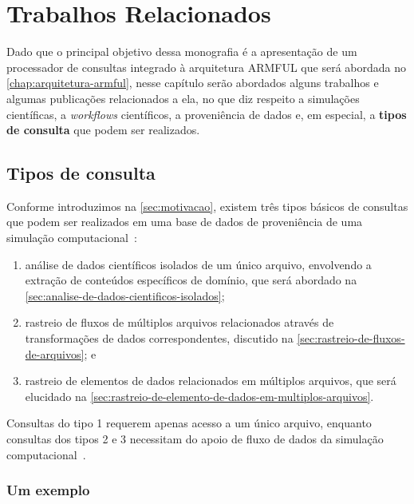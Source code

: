 
\chapter{Trabalhos Relacionados}%
\label{chap:trabalhos-relacionados}

Dado que o principal objetivo dessa monografia é a apresentação de um processador de consultas integrado à arquitetura ARMFUL que será abordada no \autoref{chap:arquitetura-armful}, nesse capítulo serão abordados alguns trabalhos e algumas publicações relacionados a ela, no que diz respeito a simulações científicas, a \textit{workflows} científicos, a proveniência de dados e, em especial, a \textbf{tipos de consulta} que podem ser realizados.

\section{Tipos de consulta}%
\label{sec:tipos-de-consulta}

Conforme introduzimos na \autoref{sec:motivacao}, existem três tipos básicos de consultas que podem ser realizados em uma base de dados de proveniência de uma simulação computacional~\cite{silva2015analyzing,silva2015propostadoutorado}:

\begin{enumerate}
    \item análise de dados científicos isolados de um único arquivo, envolvendo a extração de conteúdos específicos de domínio, que será abordado na \autoref{sec:analise-de-dados-cientificos-isolados};
    \item rastreio de fluxos de múltiplos arquivos relacionados através de transformações de dados correspondentes, discutido na \autoref{sec:rastreio-de-fluxos-de-arquivos}; e
    \item rastreio de elementos de dados relacionados em múltiplos arquivos, que será elucidado na \autoref{sec:rastreio-de-elemento-de-dados-em-multiplos-arquivos}.
\end{enumerate}

Consultas do tipo 1 requerem apenas acesso a um único arquivo, enquanto consultas dos tipos 2 e 3 necessitam do apoio de fluxo de dados da simulação computacional~\cite{silva2015analyzing}.


\subsection{Um exemplo}

